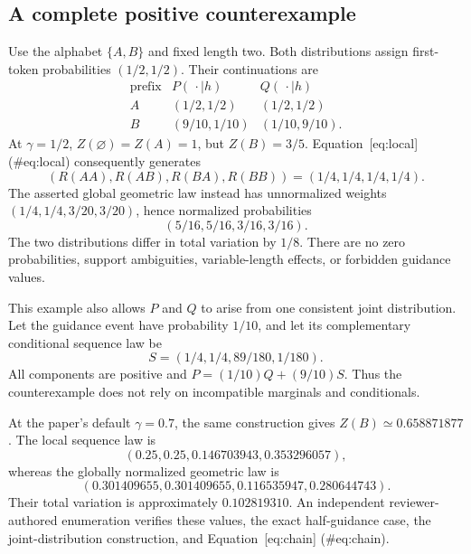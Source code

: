 \documentclass[10pt]{article}
\begin{document}
\subsection*{A complete positive counterexample}
Use the alphabet \(\{A,B\}\) and fixed length two. Both distributions assign first-token probabilities \((1/2,1/2)\). Their continuations are \[\begin{array}{c|cc}
\text{prefix} & P(\,\cdot\mid h)&Q(\,\cdot\mid h)\\ \hline
 A &(1/2,1/2)&(1/2,1/2)\\
 B &(9/10,1/10)&(1/10,9/10).
\end{array}\] At \(\gamma=1/2\), \(Z(\varnothing)=Z(A)=1\), but \(Z(B)=3/5\). Equation [eq:local] (\#eq:local) consequently generates \[(R(AA),R(AB),R(BA),R(BB))=(1/4,1/4,1/4,1/4).\] The asserted global geometric law instead has unnormalized weights \((1/4,1/4,3/20,3/20)\), hence normalized probabilities \[(5/16,5/16,3/16,3/16).\] The two distributions differ in total variation by \(1/8\). There are no zero probabilities, support ambiguities, variable-length effects, or forbidden guidance values.\par
This example also allows \(P\) and \(Q\) to arise from one consistent joint distribution. Let the guidance event have probability \(1/10\), and let its complementary conditional sequence law be \[S=(1/4,1/4,89/180,1/180).\] All components are positive and \(P=(1/10)Q+(9/10)S\). Thus the counterexample does not rely on incompatible marginals and conditionals.\par
At the paper’s default \(\gamma=0.7\), the same construction gives \(Z(B)\simeq0.658871877\). The local sequence law is \[(0.25,0.25,0.146703943,0.353296057),\] whereas the globally normalized geometric law is \[(0.301409655,0.301409655,0.116535947,0.280644743).\] Their total variation is approximately \(0.102819310\). An independent reviewer-authored enumeration verifies these values, the exact half-guidance case, the joint-distribution construction, and Equation [eq:chain] (\#eq:chain).\par
\end{document}
